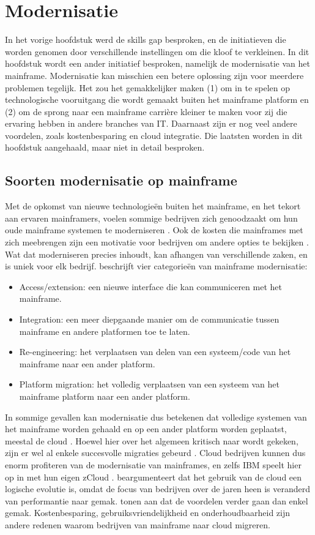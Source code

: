 \section{Modernisatie}
In het vorige hoofdstuk werd de skills gap besproken, en de initiatieven die worden genomen door verschillende instellingen om die kloof te verkleinen. In dit hoofdstuk wordt een ander initiatief besproken, namelijk de modernisatie van het mainframe. Modernisatie kan misschien een betere oplossing zijn voor meerdere problemen tegelijk. Het zou het gemakkelijker maken (1) om in te spelen op technologische vooruitgang die wordt gemaakt buiten het mainframe platform en (2) om de sprong naar een mainframe carrière kleiner te maken voor zij die ervaring hebben in andere branches van IT. Daarnaast zijn er nog veel andere voordelen, zoals kostenbesparing en cloud integratie. Die laatsten worden in dit hoofdstuk aangehaald, maar niet in detail besproken.

\subsection{Soorten modernisatie op mainframe}
Met de opkomst van nieuwe technologieën buiten het mainframe, en het tekort aan ervaren mainframers, voelen sommige bedrijven zich genoodzaakt om hun oude mainframe systemen te moderniseren \autocite{Barnett2005}. Ook de kosten die mainframes met zich meebrengen zijn een motivatie voor bedrijven om andere opties te bekijken \autocite{Vanaparthi2025}. Wat dat moderniseren precies inhoudt, kan afhangen van verschillende zaken, en is uniek voor elk bedrijf. \textcite{Barnett2005} beschrijft vier categorieën van mainframe modernisatie:
\begin{itemize}
    \item Access/extension: een nieuwe interface die kan communiceren met het mainframe.
    \item Integration: een meer diepgaande manier om de communicatie tussen mainframe en andere platformen toe te laten.
    \item Re-engineering: het verplaatsen van delen van een systeem/code van het mainframe naar een ander platform.
    \item Platform migration: het volledig verplaatsen van een systeem van het mainframe platform naar een ander platform.
\end{itemize}
In sommige gevallen kan modernisatie dus betekenen dat volledige systemen van het mainframe worden gehaald en op een ander platform worden geplaatst, meestal de cloud \autocite{Zlatanov2016}. Hoewel hier over het algemeen kritisch naar wordt gekeken, zijn er wel al enkele succesvolle migraties gebeurd \autocite{Khadka2015,Spain2025}. Cloud bedrijven kunnen dus enorm profiteren van de modernisatie van mainframes, en zelfs IBM speelt hier op in met hun eigen zCloud \autocite{NgoYe2018}. \textcite{Zlatanov2016} beargumenteert dat het gebruik van de cloud een logische evolutie is, omdat de focus van bedrijven over de jaren heen is veranderd van performantie naar gemak. \textcite{Vanaparthi2025,Khadka2015} tonen aan dat de voordelen verder gaan dan enkel gemak. Kostenbesparing, gebruiksvriendelijkheid en onderhoudbaarheid zijn andere redenen waarom bedrijven van mainframe naar cloud migreren. 

